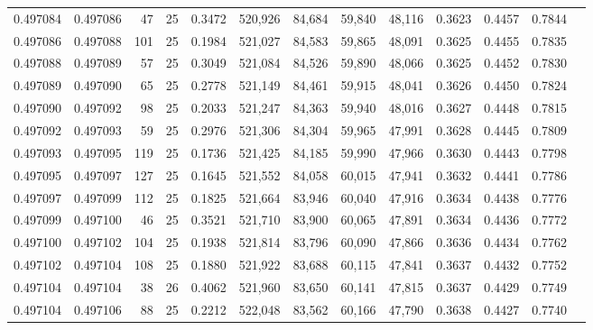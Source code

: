 \begin{tabular}{rrrrrrrrrrrrr}
0.497084 & 0.497086 &    47 &  25 &                                     0.3472 & 520,926 &  84,684 &  59,840 &  48,116 & 0.3623 & 0.4457 & 0.7844 \\
0.497086 & 0.497088 &   101 &  25 &                                     0.1984 & 521,027 &  84,583 &  59,865 &  48,091 & 0.3625 & 0.4455 & 0.7835 \\
0.497088 & 0.497089 &    57 &  25 &                                     0.3049 & 521,084 &  84,526 &  59,890 &  48,066 & 0.3625 & 0.4452 & 0.7830 \\
0.497089 & 0.497090 &    65 &  25 &                                     0.2778 & 521,149 &  84,461 &  59,915 &  48,041 & 0.3626 & 0.4450 & 0.7824 \\
0.497090 & 0.497092 &    98 &  25 &                                     0.2033 & 521,247 &  84,363 &  59,940 &  48,016 & 0.3627 & 0.4448 & 0.7815 \\
0.497092 & 0.497093 &    59 &  25 &                                     0.2976 & 521,306 &  84,304 &  59,965 &  47,991 & 0.3628 & 0.4445 & 0.7809 \\
0.497093 & 0.497095 &   119 &  25 &                                     0.1736 & 521,425 &  84,185 &  59,990 &  47,966 & 0.3630 & 0.4443 & 0.7798 \\
0.497095 & 0.497097 &   127 &  25 &                                     0.1645 & 521,552 &  84,058 &  60,015 &  47,941 & 0.3632 & 0.4441 & 0.7786 \\
0.497097 & 0.497099 &   112 &  25 &                                     0.1825 & 521,664 &  83,946 &  60,040 &  47,916 & 0.3634 & 0.4438 & 0.7776 \\
0.497099 & 0.497100 &    46 &  25 &                                     0.3521 & 521,710 &  83,900 &  60,065 &  47,891 & 0.3634 & 0.4436 & 0.7772 \\
0.497100 & 0.497102 &   104 &  25 &                                     0.1938 & 521,814 &  83,796 &  60,090 &  47,866 & 0.3636 & 0.4434 & 0.7762 \\
0.497102 & 0.497104 &   108 &  25 &                                     0.1880 & 521,922 &  83,688 &  60,115 &  47,841 & 0.3637 & 0.4432 & 0.7752 \\
0.497104 & 0.497104 &    38 &  26 &                                     0.4062 & 521,960 &  83,650 &  60,141 &  47,815 & 0.3637 & 0.4429 & 0.7749 \\
0.497104 & 0.497106 &    88 &  25 &                                     0.2212 & 522,048 &  83,562 &  60,166 &  47,790 & 0.3638 & 0.4427 & 0.7740 \\

\end{tabular}
